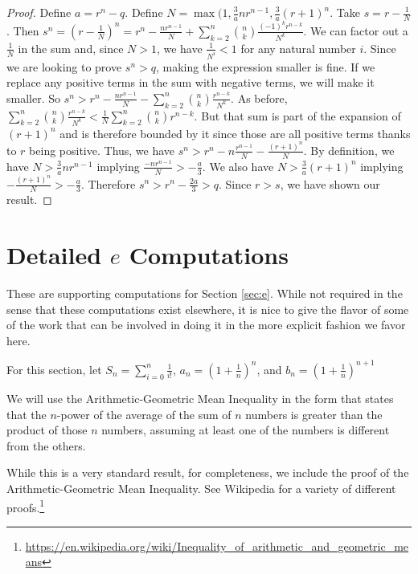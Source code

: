 \documentclass[12pt]{article}
\begin{document}
\begin{proof}
Define $a = r^n - q$. Define $N =  \max(1,\tfrac{3}{a}n r^{n-1}, \tfrac{3}{a}(r+1)^n$.  Take $s = r - \tfrac{1}{N}$. Then $s^n = (r- \tfrac{1}{N})^n = r^n - \tfrac{n r^{n-1}}{N} + \sum_{k=2}^{n} \binom{n}{k} \tfrac{ (-1)^{k} r^{n-k}}{N^{k}}$. We can factor out a $\tfrac{1}{N}$ in the sum and, since $N > 1$, we have $\tfrac{1}{N^i} < 1$ for any natural number $i$. Since we are looking to prove $s^n > q$, making the expression smaller is fine. If we replace any positive terms in the sum with negative terms, we will make it smaller. So $s^n > r^n - \tfrac{n r^{n-1}}{N} - \sum_{k=2}^{n} \binom{n}{k} \tfrac{r^{n-k}}{N^{k}}$. As before, $\sum_{k=2}^{n} \binom{n}{k} \tfrac{r^{n-k}}{N^{k}} < \tfrac{1}{N} \sum_{k=2}^{n} \binom{n}{k} r^{n-k}$.  But that sum is part of the expansion of $(r+1)^n$ and is therefore bounded by it since those are all positive terms thanks to $r$ being positive. Thus, we have $s^n > r^n - n \tfrac{r^{n-1}}{N} - \tfrac{ (r+1)^n }{N}$.  By definition, we have $N > \tfrac{3}{a} n r^{n-1}$ implying $ \tfrac{-n r^{n-1}}{N} > -\tfrac{a}{3}$. We also have $N > \tfrac{3}{a} (r+1)^n$ implying $ -\tfrac{(r+1)^n}{N} > -\tfrac{a}{3}$. Therefore $s^n > r^n - \tfrac{2 a}{3} > q$. Since $r>s$, we have shown our result. 
\end{proof}

\section{Detailed $e$ Computations}\label{app:e}

These are supporting computations for Section \ref{sec:e}. While not required in the sense that these computations exist elsewhere, it is nice to give the flavor of some of the work that can be involved in doing it in the more explicit fashion we favor here. 

For this section, let $S_n = \sum_{i=0}^n \frac{1}{i!}$, $a_n = (1+\frac{1}{n})^{n}  $, and $b_n = (1+\frac{1}{n})^{n+1}$

We will use the Arithmetic-Geometric Mean Inequality in the form that states that the $n$-power of the average of the sum of $n$ numbers is greater than the product of those $n$ numbers, assuming at least one of the numbers is different from the others. 

While this is a very standard result, for completeness, we include the proof of the Arithmetic-Geometric Mean Inequality. See Wikipedia for a variety of different proofs.\footnote{\url{https://en.wikipedia.org/wiki/Inequality_of_arithmetic_and_geometric_means}}
\end{document}
